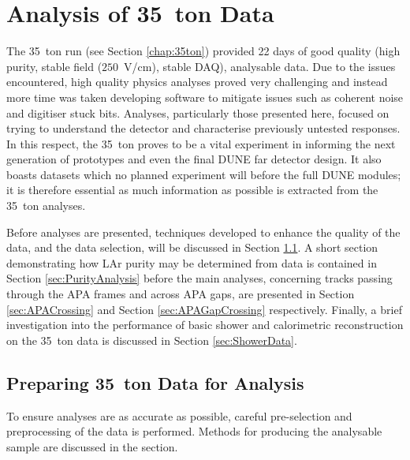 
\graphicspath{{35tonAnalysis/Figs/}}

\chapter{Analysis of 35~ton Data}\label{chap:35tAnalysis}

The 35~ton run (see Section \ref{chap:35ton}) provided 22 days of good quality (high purity, stable field ($250$~V/cm), stable DAQ), analysable data.  Due to the issues encountered, high quality physics analyses proved very challenging and instead more time was taken developing software to mitigate issues such as coherent noise and digitiser stuck bits.  Analyses, particularly those presented here, focused on trying to understand the detector and characterise previously untested responses.  In this respect, the 35~ton proves to be a vital experiment in informing the next generation of prototypes and even the final DUNE far detector design.  It also boasts datasets which no planned experiment will before the full DUNE modules; it is therefore essential as much information as possible is extracted from the 35~ton analyses.

Before analyses are presented, techniques developed to enhance the quality of the data, and the data selection, will be discussed in Section \ref{sec:Preparing35tonData}.  A short section demonstrating how LAr purity may be determined from data is contained in Section \ref{sec:PurityAnalysis} before the main analyses, concerning tracks passing through the APA frames and across APA gaps, are presented in Section \ref{sec:APACrossing} and Section \ref{sec:APAGapCrossing} respectively.  Finally, a brief investigation into the performance of basic shower and calorimetric reconstruction on the 35~ton data is discussed in Section \ref{sec:ShowerData}.

\section{Preparing 35~ton Data for Analysis}\label{sec:Preparing35tonData}

To ensure analyses are as accurate as possible, careful pre-selection and preprocessing of the data is performed.  Methods for producing the analysable sample are discussed in the section.

